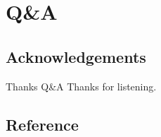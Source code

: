 \section{Q\&A}
\subsection{Acknowledgements}
\begin{frame}{Thanks Q\&A}
  Thanks for listening.
\end{frame}

\subsection{Reference}
\frame{}
